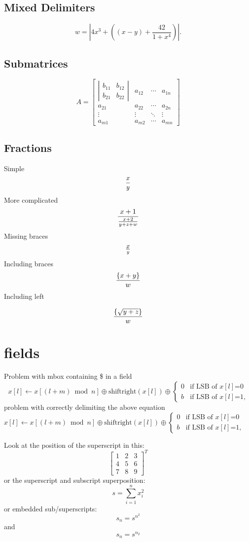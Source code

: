 ﻿\documentclass{article}
\begin{document}
\subsection{Mixed Delimiters}
\[
w =  \left| 4 x^3 + \left( (x-y) + \frac{42}{1+x^4} \right) \right|.
\]

\subsection{Submatrices}
\[
A = \left[ \begin{array}{cccc}
\left|\begin{array}{cc}
b_{11}&b_{12}\\
b_{21}&b_{22}
\end{array}\right|
 & a_{12} & \cdots & a_{1n}\\
a_{21} & a_{22} & \cdots & a_{2n}\\
\vdots & \vdots & \ddots & \vdots\\
a_{m1} & a_{m2} & \cdots & a_{mn}
\end{array} \right]
\]

\subsection{Fractions}
Simple
\[
{x \over y}
\]
More complicated
\[
{x+1 \over {x+2 \over y+z +w}}
\]
Missing braces
\[
x \over y
\]
Including braces
\[
{\{ x+y \} \over w}
\]
Including left

\[
{\left\{\sqrt{y+z}\right\}\over w}
\]

\section{fields}
Problem with mbox containing \$ in a field
\[
x[l]\leftarrow x[(l+m) \bmod  n] \oplus \mbox{shiftright}(x[l])
 \oplus \left\{ \begin{array}{ll}
                0   & \mbox{if LSB of $x[l]$=0} \\
                b   & \mbox{if LSB of $x[l]$=1,}
               \end{array}
        \right.
\]
problem with correctly delimiting the above equation 
$
x[l]\leftarrow x[(l+m) \bmod  n] \oplus \mbox{shiftright}(x[l])
 \oplus \left\{ \begin{array}{ll}
                0   & \mbox{if LSB of $x[l]$=0} \\
                b   & \mbox{if LSB of $x[l]$=1,}
               \end{array}
        \right.
$

Look at the position of the superscript in this:
\[
  \left[
    \begin{array}{ccc}
      1 & 2 & 3\\
      4 & 5 & 6\\
      7 & 8 & 9
    \end{array}
  \right]^T
\]
or the superscript and subscript superposition:
\[
  s = \sum_{i=1}^n x^2_i
\]
or embedded sub/superscripts:
\[
  s_n=s^{n^2}
\]
and
\[
  s_n=s^{n_2}
\]
\end{document}
